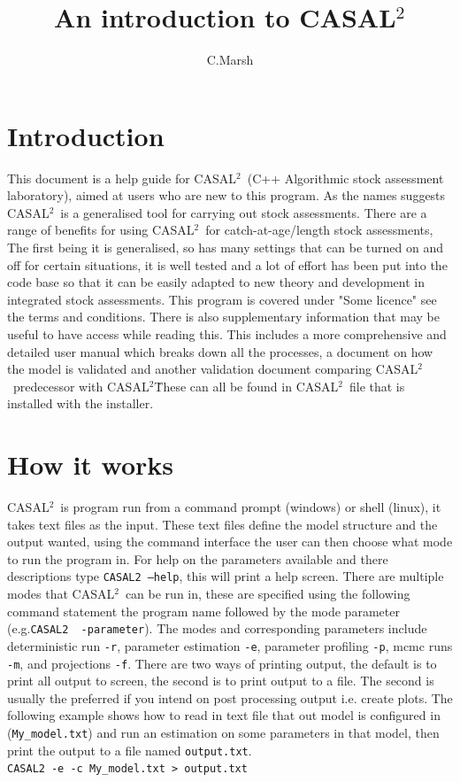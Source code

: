 \documentclass[12pt]{article}
\newcommand{\cas}{\texttt{CASAL2}}
\newcommand{\CAS}{CASAL$^2$}
\begin{document}
	\title{An introduction to CASAL$^2$}
	\author{C.Marsh}
	\maketitle
\section{Introduction}\label{sec:intro}
This document is a help guide for \CAS\ (C++ Algorithmic stock assessment laboratory), aimed at users who are new to this program. As the names suggests \CAS\ is a generalised tool for carrying out stock assessments. There are a range of benefits for using \CAS\ for catch-at-age/length stock assessments, The first being it is generalised, so has many settings that can be turned on and off for certain situations, it is well tested and a lot of effort has been put into the code base so that it can be easily adapted to new theory and development in integrated stock assessments. 
This program is covered under "Some licence" see the terms and conditions. There is also supplementary information that may be useful to have access while reading this. This includes a more comprehensive and detailed user manual which breaks down all the processes, a document on how the model is validated and another validation document comparing \CAS\ predecessor with \CAS\. These can all be found in \CAS\ file that is installed with the installer.


\section{How it works}\label{Sec:how}
\CAS\ is program run from a command prompt (windows) or shell (linux), it takes text files as the input. These text files define the model structure and the output wanted, using the command interface the user can then choose what mode to run the program in. For help on the parameters available and there descriptions type \cas\ \texttt{--help}, this will print a help screen. There are multiple modes that \CAS\ can be run in, these are specified using the following command statement the program name followed by the mode parameter (e.g.\cas\ \texttt{ -parameter}). The modes and corresponding parameters include deterministic run \texttt{-r}, parameter estimation \texttt{-e}, parameter profiling \texttt{-p}, mcmc runs \texttt{-m}, and projections \texttt{-f}. There are two ways of printing output, the default is to print all output to screen, the second is to print output to a file. The second is usually the preferred if you intend on post processing output i.e. create plots. The following example shows how to read in text file that out model is configured in (\texttt{My\_model.txt}) and run an estimation on some parameters in that model, then print the output to a file named \texttt{output.txt}.\\
\cas\ \texttt{-e  -c My\_model.txt > output.txt}
\end{document}
